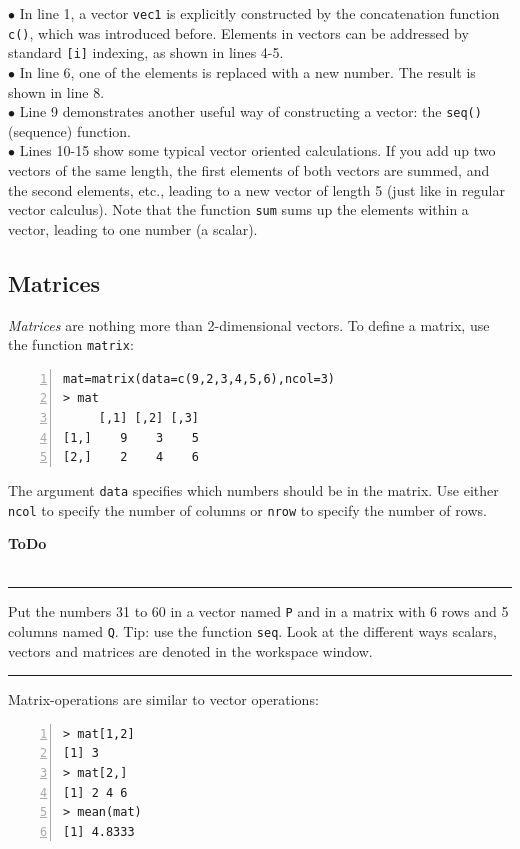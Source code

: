 \documentclass[a4paper,11pt,twocolumn,tablecaptionabove]{scrartcl}
\newenvironment{ToDo} {%
  \begin{flushright}
    \hfill
    \begin{minipage}{0.95\columnwidth}         %
    \textsf{\textbf{ToDo}} \\
      \vspace{-0.85cm}\\
      {\color{Gray}\rule[-0.1cm]{\columnwidth}{1.5pt}}} { %
      {\color{Gray} \rule[0.3cm]{\columnwidth}{1.5pt}}
    \end{minipage}
    \vspace{1em}
  \end{flushright}
  }
\begin{document}
\noindent $\bullet$  In line 1, a vector \texttt{vec1} is explicitly constructed by the concatenation function \texttt{c()}, which was introduced before. Elements in vectors can be addressed by standard \texttt{[i]} indexing, as shown in lines 4-5. \\
\noindent $\bullet$  In line 6, one of the elements is replaced with a new number. The result is shown in line 8.\\
\noindent $\bullet$ Line 9 demonstrates another useful way of constructing a vector: the \texttt{seq()} (sequence) function. \\
\noindent $\bullet$ Lines 10-15 show some typical vector oriented calculations. If you add up two vectors of the same length, the first elements of both vectors are summed, and the second elements, etc., leading to a new vector of length 5 (just like in regular vector calculus). Note that the function \texttt{sum} sums up the elements within a vector, leading to one number (a scalar).

\subsection{Matrices}

\emph{Matrices} are nothing more than 2-dimensional vectors. To define a matrix, use the function \texttt{matrix}:
\begin{Verbatim}[frame=single,numbers=left,gobble=0, xleftmargin=0.35cm, numbersep=0.1cm]
mat=matrix(data=c(9,2,3,4,5,6),ncol=3)
> mat
     [,1] [,2] [,3]
[1,]    9    3    5
[2,]    2    4    6
\end{Verbatim}

The argument \texttt{data} specifies which numbers should be in the matrix. Use either  \texttt{ncol} to specify the number of columns or \texttt{nrow} to specify the number of rows. 

\begin{ToDo}
Put the numbers 31 to 60 in a vector named \texttt{P} and in a matrix with 6 rows and 5 columns named \texttt{Q}. Tip: use the function \texttt{seq}. Look at the different ways scalars, vectors and matrices are denoted in the workspace window.\\
\end{ToDo}
 
 Matrix-operations are similar to vector operations:

\begin{Verbatim}[frame=single,numbers=left,gobble=0, xleftmargin=0.35cm, numbersep=0.1cm]
> mat[1,2]
[1] 3
> mat[2,]
[1] 2 4 6
> mean(mat)
[1] 4.8333
\end{Verbatim}
\end{document}

